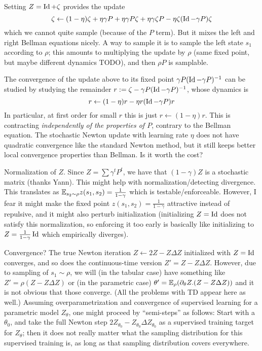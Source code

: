 \documentclass[11pt,a4paper]{article}
\begin{document}
Setting $Z=\operatorname{Id}+\zeta$ provides the update
\begin{equation}
\zeta\gets (1-\eta)\zeta+\eta\gamma P+\eta\gamma P\zeta
+\eta\gamma \zeta P-\eta\zeta(\operatorname{Id}-\gamma P)\zeta
\end{equation}
which we cannot quite sample (because of the $P$ term). But it mixes the
left and right Bellman equations nicely. A way to sample it is to sample
the left state $s_1$ according to $\rho$; this amounts to multiplying the
update by $\rho$ (same fixed point, but maybe different dynamics TODO),
and then $\rho P$ is samplable.

The convergence of the update above to its fixed point $\gamma
P(\operatorname{Id}-\gamma P)^{-1}$ can be studied by studying the
remainder $r\mathrel{\mathop{:}}= \zeta-\gamma
P(\operatorname{Id}-\gamma P)^{-1}$, whose dynamics is
\begin{equation}
r\gets (1-\eta) r-\eta r(\operatorname{Id}-\gamma P)r
\end{equation}
In particular, at first order for small $r$ this is just $r\gets
(1-\eta)r$. This is contracting \emph{independently of the properties of
$P$}, contrary to the Bellman equation. The stochastic
Newton update with learning rate $\eta$ does not have quadratic
convergence like the standard Newton method, but it still keeps better
local convergence properties than Bellman. Is it worth the cost?

Normalization of $Z$. Since $Z=\sum \gamma^t P^t$, we have that
$(1-\gamma)Z$ is a stochastic matrix (thanks Yann). This might help with
normalization/detecting divergence. This translates as $\mathbb{E}_{s_2\sim \rho}
z(s_1,s_2)=\frac{1}{1-\gamma}$ which is testable/enforceable. However, I
fear it might make the fixed point $z(s_1,s_2)=\frac{1}{1-\gamma}$
attractive instead of repulsive, and it might also perturb initialization
(initializing $Z=\operatorname{Id}$ does not satisfy this normalization, so enforcing
it too early is basically like initializing to
$Z=\frac{1}{1-\gamma}\operatorname{Id}$ which empirically diverges).

Convergence? The true Newton iteration $Z\gets 2Z-Z\Delta Z$ initialized
with $Z=\operatorname{Id}$ converges, and so does the continuous-time version
$Z'=Z-Z\Delta Z$. However, due to sampling of $s_1\sim \rho$, we will (in
the tabular case) have something like $Z'=\rho(Z-Z\Delta Z)$ or (in the
parametric case) $\theta'=\mathbb{E}_\rho (\partial_\theta Z.(Z-Z\Delta Z))$ and
it is not obvious that those converge. (All the problems with TD appear
here as well.) Assuming overparametrization and convergence of supervised
learning for a parametric model $Z_\theta$, one might proceed by
``semi-steps'' as follows: Start with a $\theta_0$, and take the full
Newton step $2Z_{\theta_0}-Z_{\theta_0}\Delta Z_{\theta_0}$ as a
supervised training target for $Z_\theta$; then it does not really matter
what the sampling distribution for this supervised training is, as long
as that sampling distribution covers everywhere.
\end{document}
